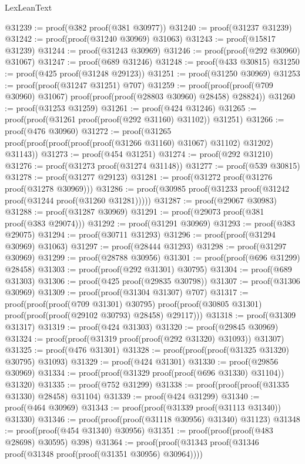\begin{lexlean}{LexLeanText}
\begin{coremodule}
@31239 := proof(@382 proof(@381 @30977))
@31240 := proof(@31237 @31239)
@31242 := proof(proof(@31240 @30969) @31063)
@31243 := proof(@15817 @31239)
@31244 := proof(@31243 @30969)
@31246 := proof(proof(@292 @30960) @31067)
@31247 := proof(@689 @31246)
@31248 := proof(@433 @30815)
@31250 := proof(@425 proof(@31248 @29123))
@31251 := proof(@31250 @30969)
@31253 := proof(proof(@31247 @31251) @707)
@31259 := proof(proof(proof(@709 @30960) @31067) proof(proof(proof(@28803 @30960) @28458) @28824))
@31260 := proof(@31253 @31259)
@31261 := proof(@424 @31246)
@31265 := proof(proof(@31261 proof(proof(@292 @31160) @31102)) @31251)
@31266 := proof(@476 @30960)
@31272 := proof(@31265 proof(proof(proof(proof(proof(@31266 @31160) @31067) @31102) @31202) @31143))
@31273 := proof(@454 @31251)
@31274 := proof(@292 @31210)
@31276 := proof(@31273 proof(@31274 @31148))
@31277 := proof(@539 @30815)
@31278 := proof(@31277 @29123)
@31281 := proof(@31272 proof(@31276 proof(@31278 @30969)))
@31286 := proof(@30985 proof(@31233 proof(@31242 proof(@31244 proof(@31260 @31281)))))
@31287 := proof(@29067 @30983)
@31288 := proof(@31287 @30969)
@31291 := proof(@29073 proof(@381 proof(@383 @29074)))
@31292 := proof(@31291 @30969)
@31293 := proof(@383 @29075)
@31294 := proof(@30711 @31293)
@31296 := proof(proof(@31294 @30969) @31063)
@31297 := proof(@28444 @31293)
@31298 := proof(@31297 @30969)
@31299 := proof(@28788 @30956)
@31301 := proof(proof(@696 @31299) @28458)
@31303 := proof(proof(@292 @31301) @30795)
@31304 := proof(@689 @31303)
@31306 := proof(@425 proof(@29835 @30798))
@31307 := proof(@31306 @30969)
@31309 := proof(proof(@31304 @31307) @707)
@31317 := proof(proof(proof(@709 @31301) @30795)
      proof(proof(@30805 @31301) proof(proof(proof(@29102 @30793) @28458) @29117)))
@31318 := proof(@31309 @31317)
@31319 := proof(@424 @31303)
@31320 := proof(@29845 @30969)
@31324 := proof(proof(@31319 proof(proof(@292 @31320) @31093)) @31307)
@31325 := proof(@476 @31301)
@31328 := proof(proof(proof(@31325 @31320) @30795) @31093)
@31329 := proof(@424 @31301)
@31330 := proof(@29856 @30969)
@31334 := proof(proof(@31329 proof(proof(@696 @31330) @31104)) @31320)
@31335 := proof(@752 @31299)
@31338 := proof(proof(proof(@31335 @31330) @28458) @31104)
@31339 := proof(@424 @31299)
@31340 := proof(@464 @30969)
@31343 := proof(proof(@31339 proof(@31113 @31340)) @31330)
@31346 := proof(proof(proof(@31118 @30956) @31340) @31123)
@31348 := proof(proof(@454 @31340) @30956)
@31351 := proof(proof(proof(@483 @28698) @30595) @398)
@31364 := proof(proof(@31343 proof(@31346 proof(@31348 proof(proof(@31351 @30956) @30964))))

\end{coremodule}
\end{lexlean}
